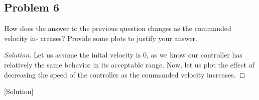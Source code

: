\documentclass{article}
\begin{document}
\subsection*{Problem 6}
How does the answer to the previous question changes as the commanded velocity in-
creases? Provide some plots to justify your answer.

\begin{proof}[Solution]

Let us assume the inital velocity is 0, as we know our controller has relatively the same behavior in its acceptable range.
Now, let us plot the effect of decreasing the speed of the controller as the commanded velocity increases.



\end{proof}[Solution]
\end{document}
